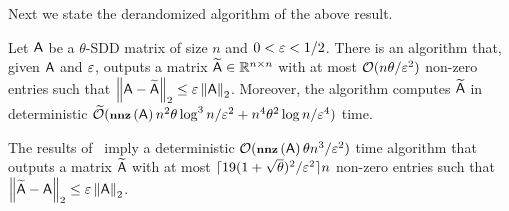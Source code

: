 Next we state the derandomized algorithm of the above result.
%
%
\begin{theorem}\label{thm:matrix_sparsif:det}
Let ${\mathsf{A} }$ be a $\theta$-SDD matrix of size $n$ and $ 0 < \varepsilon <1/2$.  There is an algorithm that, given ${\mathsf{A} }$ and $ \varepsilon$, outputs a matrix $\widetilde{{\mathsf{A} }}\in \mathbb{R}^{n\times n}$ with at most $\mathcal{O}( n \theta /\varepsilon^2)$ non-zero entries such that $\left\|{\mathsf{A} } - \widetilde{{\mathsf{A} }}\right\|_2 \leq \varepsilon \left\|{\mathsf{A} }\right\|_2$. Moreover, the algorithm computes $\widetilde{{\mathsf{A} }}$ in deterministic $\widetilde{\mathcal{O}}(\operatorname{\textbf{\footnotesize nnz}}\left({\mathsf{A} }\right) n^2 \theta\log^3 n  /\varepsilon^2 + n^4 \theta^2 \log n /\varepsilon^4)$ time.
\end{theorem}
\begin{remark}
The results of~\cite{graph:sparsifiers:twice_ram,phdthesis:Srivastava:2010} imply a deterministic $\mathcal{O}(\operatorname{\textbf{\footnotesize nnz}}\left({\mathsf{A} }\right) \theta n^3 /\varepsilon^2 )$ time algorithm that outputs a matrix $\widetilde{{\mathsf{A} }}$ with at most $ \lceil 19(1+\sqrt{\theta})^2 /\varepsilon^2\rceil n $ non-zero entries such that $\left\|\widetilde{{\mathsf{A} }}-{\mathsf{A} }\right\|_2 \leq \varepsilon\left\|{\mathsf{A} }\right\|_2$.
\end{remark}
